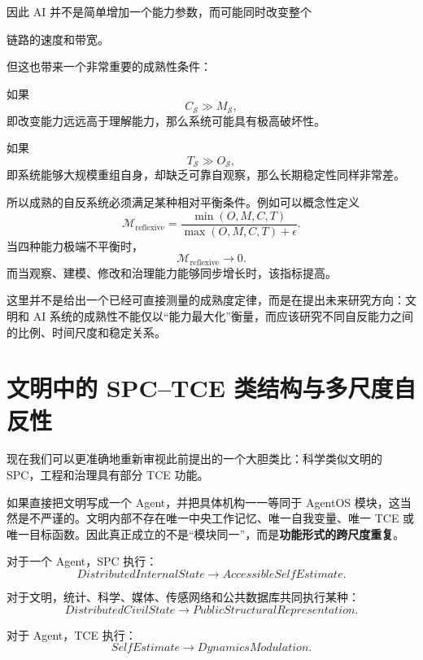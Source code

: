 因此 AI 并不是简单增加一个能力参数，而可能同时改变整个
\begin{statementbox}
\centering
{}
\end{statementbox}
链路的速度和带宽。

但这也带来一个非常重要的成熟性条件：
\begin{statementbox}
\centering
{}
\end{statementbox}

如果
\[
C_{\mathcal S}\gg M_{\mathcal S},
\]
即改变能力远远高于理解能力，那么系统可能具有极高破坏性。

如果
\[
T_{\mathcal S}\gg O_{\mathcal S},
\]
即系统能够大规模重组自身，却缺乏可靠自观察，那么长期稳定性同样非常差。

所以成熟的自反系统必须满足某种相对平衡条件。例如可以概念性定义
\[
\mathcal M_{\mathrm{reflexive}}
=
\frac{
\min(
O,M,C,T
)
}{
\max(
O,M,C,T
)+\epsilon
}.
\]
当四种能力极端不平衡时，
\[
\mathcal M_{\mathrm{reflexive}}\rightarrow0.
\]
而当观察、建模、修改和治理能力能够同步增长时，该指标提高。

这里并不是给出一个已经可直接测量的成熟度定律，而是在提出未来研究方向：文明和 AI 系统的成熟性不能仅以“能力最大化”衡量，而应该研究不同自反能力之间的比例、时间尺度和稳定关系。


\section{文明中的 SPC--TCE 类结构与多尺度自反性}

现在我们可以更准确地重新审视此前提出的一个大胆类比：科学类似文明的 SPC，工程和治理具有部分 TCE 功能。

如果直接把文明写成一个 Agent，并把具体机构一一等同于 AgentOS 模块，这当然是不严谨的。文明内部不存在唯一中央工作记忆、唯一自我变量、唯一 TCE 或唯一目标函数。因此真正成立的不是“模块同一”，而是\textbf{功能形式的跨尺度重复}。

对于一个 Agent，SPC 执行：
\[
DistributedInternalState
\rightarrow
AccessibleSelfEstimate.
\]

对于文明，统计、科学、媒体、传感网络和公共数据库共同执行某种：
\[
DistributedCivilState
\rightarrow
PublicStructuralRepresentation.
\]

对于 Agent，TCE 执行：
\[
SelfEstimate
\rightarrow
DynamicsModulation.
\]

